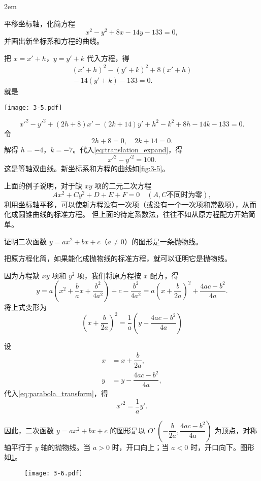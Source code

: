\medskip\noindent
\begin{minipage}{0.53\linewidth}\parindent2em
\begin{example}
  平移坐标轴，化简方程
  \[x^2-y^2+8x-14y-133=0,\]
  并画出新坐标系和方程的曲线。
\end{example}
\begin{solution}
  把 $x=x'+h$，$y=y'+k$ 代入方程，得
  \begin{multline*}(x'+h)^2-(y'+k)^2+8(x'+h)\\{}-14(y'+k)-133=0.\end{multline*}
  就是
\end{solution}
\end{minipage}\hfill
\begin{minipage}{0.42\linewidth}\centering
\begin{figurehere}
  \texttt{[image: 3-5.pdf]}
  \caption{}\label{fig:3-5}
\end{figurehere}
\end{minipage}
\begin{equation}
  \label{eq:translation_expand}
  x'^2-y'^2+(2h+8)x'-(2k+14)y'+h^2-k^2+8h-14k-133=0.
\end{equation}
令
\[2h+8=0,\quad 2k+14=0.\]
解得 $h=-4$，$k=-7$。代入\cref{eq:translation_expand}，得
\[x'^2-y'^2=100.\]
这是等轴双曲线。新坐标系和方程的曲线如\cref{fig:3-5}。

\bigskip
上面的例子说明，对于缺 $xy$ 项的二元二次方程
\[ Ax^2+Cy^2+D+E+F=0\quad(A,C\text{不同时为零}),\]
利用坐标轴平移，可以使新方程没有一次项（或没有一个一次项和常数项），从而化成圆锥曲线的标准方程。
但上面的待定系数法，往往不如从原方程配方开始简单。

\begin{example}
  证明二次函数 $y=ax^2+bx+c$（$a\neq 0$）的图形是一条抛物线。
\end{example}
\begin{solution}
  把原方程化简，如果能化成抛物线的标准方程，就可以证明它是抛物线。

  因为方程缺 $xy$ 项和 $y^2$ 项，我们将原方程按 $x$ 配方，得
  \[y=a\left(x^2+\frac{b}{a}x+\frac{b^2}{4a^2}\right)+c-\frac{b^2}{4a^2}=a\left(x+\frac{b}{2a}\right)^2+\frac{4ac-b^2}{4a}.\]
  将上式变形为
  \begin{equation}
    \label{eq:parabola_transform}
    \left(x+\frac{b}{2a}\right)^2=\frac{1}{a}\left(y-\frac{4ac-b^2}{4a}\right)
  \end{equation}

  设
  \begin{align*}
    x&=x+\dfrac{b}{2a}, \\
    y&=y-\dfrac{4ac-b^2}{4a},
  \end{align*}
  代入\cref{eq:parabola_transform}，得
  \[ x'^2=\frac{1}{a}y'.\]

  因此，二次函数 $y=ax^2+{bx}+c$ 的图形是以 $O'\,\left(-\dfrac{b}{2a},\dfrac{4ac-b^2}{4a}\right)$ 为顶点，对称轴平行于 $y$ 轴的抛物线。当 $a>0$ 时，开口向上；当 $a<0$ 时，开口向下。图形如\cref{fig:3-6}。
\end{solution}
\begin{figure}
  \texttt{[image: 3-6.pdf]}
  \caption{}\label{fig:3-6}
\end{figure}

